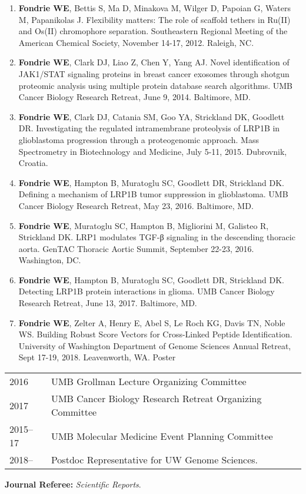\documentclass{article}
\newcommand{\mysection}[1]{\vspace{1ex}{\bf #1}}
\begin{document}
\mysection{Poster Presentations}

\begin{enumerate}
  \item {\bf Fondrie WE}, Bettis S, Ma D, Minakova M, Wilger D, Papoian G, Waters M, Papanikolas J. Flexibility matters: The role of scaffold tethers in Ru(II) and Os(II) chromophore separation. Southeastern Regional Meeting of the American Chemical Society, November 14-17, 2012. Raleigh, NC.

  \item {\bf Fondrie WE}, Clark DJ, Liao Z, Chen Y, Yang AJ. Novel identification of JAK1/STAT signaling proteins in breast cancer exosomes through shotgun proteomic analysis using multiple protein database search algorithms. UMB Cancer Biology Research Retreat, June 9, 2014. Baltimore, MD.

  \item {\bf Fondrie WE}, Clark DJ, Catania SM, Goo YA, Strickland DK, Goodlett DR. Investigating the regulated intramembrane proteolysis of LRP1B in glioblastoma progression through a proteogenomic approach. Mass Spectrometry in Biotechnology and Medicine, July 5-11, 2015. Dubrovnik, Croatia.

  \item {\bf Fondrie WE}, Hampton B, Muratoglu SC, Goodlett DR, Strickland DK. Defining a mechanism of LRP1B tumor suppression in glioblastoma. UMB Cancer Biology Research Retreat, May 23, 2016. Baltimore, MD.

  \item {\bf Fondrie WE}, Muratoglu SC, Hampton B, Migliorini M, Galisteo R, Strickland DK. LRP1 modulates TGF-β signaling in the descending thoracic aorta. GenTAC Thoracic Aortic Summit, September 22-23, 2016. Washington, DC.

  \item {\bf Fondrie WE}, Hampton B, Muratoglu SC, Goodlett DR, Strickland DK. Detecting LRP1B protein interactions in glioma. UMB Cancer Biology Research Retreat, June 13, 2017. Baltimore, MD.

  \item {\bf Fondrie WE}, Zelter A, Henry E, Abel S, Le Roch KG, Davis TN, Noble WS. Building Robust Score Vectors for Cross-Linked Peptide Identification. University of Washington Department of Genome Sciences Annual Retreat, Sept 17-19, 2018. Leavenworth, WA. Poster
\end{enumerate}

\mysection{Professional Service}

\begin{tabular}{p{0.5in}p{5.75in}}
  2016       & UMB Grollman Lecture Organizing Committee \\
  2017       & UMB Cancer Biology Research Retreat Organizing Committee \\
  2015--17 & UMB Molecular Medicine Event Planning Committee \\
  2018--     & Postdoc Representative for UW Genome Sciences. \\ 
\end{tabular}

{\bf Journal Referee: }{\em Scientific Reports}.
\end{document}
